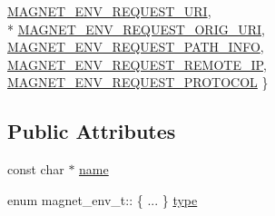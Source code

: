 \begin{DoxyCompactItemize}
\hyperlink{structmagnet__env__t_a60cf26abb5b12c72c0cc144a004c05e4a75ac689bcc2b86e09d258f29dd3b78ae}{M\-A\-G\-N\-E\-T\-\_\-\-E\-N\-V\-\_\-\-R\-E\-Q\-U\-E\-S\-T\-\_\-\-U\-R\-I}, 
\\*
\hyperlink{structmagnet__env__t_a60cf26abb5b12c72c0cc144a004c05e4a4b14aa72595aecbab664751cd4ffbc12}{M\-A\-G\-N\-E\-T\-\_\-\-E\-N\-V\-\_\-\-R\-E\-Q\-U\-E\-S\-T\-\_\-\-O\-R\-I\-G\-\_\-\-U\-R\-I}, 
\hyperlink{structmagnet__env__t_a60cf26abb5b12c72c0cc144a004c05e4a9d91c63e8e772e74ae53a2dd938b2579}{M\-A\-G\-N\-E\-T\-\_\-\-E\-N\-V\-\_\-\-R\-E\-Q\-U\-E\-S\-T\-\_\-\-P\-A\-T\-H\-\_\-\-I\-N\-F\-O}, 
\hyperlink{structmagnet__env__t_a60cf26abb5b12c72c0cc144a004c05e4abcb6a72a9024dd92018c4409620ce733}{M\-A\-G\-N\-E\-T\-\_\-\-E\-N\-V\-\_\-\-R\-E\-Q\-U\-E\-S\-T\-\_\-\-R\-E\-M\-O\-T\-E\-\_\-\-I\-P}, 
\hyperlink{structmagnet__env__t_a60cf26abb5b12c72c0cc144a004c05e4a3f3973608ec3c8efdbd21fbb442483c4}{M\-A\-G\-N\-E\-T\-\_\-\-E\-N\-V\-\_\-\-R\-E\-Q\-U\-E\-S\-T\-\_\-\-P\-R\-O\-T\-O\-C\-O\-L}
 \}
\end{DoxyCompactItemize}
\subsection*{Public Attributes}
\begin{DoxyCompactItemize}
\item 
const char $\ast$ \hyperlink{structmagnet__env__t_ae7d59ff3aa3b40bcf17d17ce19f85eb9}{name}
\item 
enum magnet\-\_\-env\-\_\-t\-:: \{ ... \}  \hyperlink{structmagnet__env__t_a297ca9f969a66e5ca6a179ccf3ebb5f1}{type}
\end{DoxyCompactItemize}


